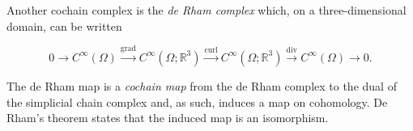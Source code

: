 \begin{tcolorbox}[enhanced,breakable,colback=KuangNei,frame hidden,boxrule=0pt,sharpish corners,before skip=10pt,after skip=10pt]
{Another cochain complex is the \emph{de Rham complex} which, on a three-dimensional domain, can be written}

\[
0\to C^\infty(\Omega)\xrightarrow{\operatorname{grad}}C^\infty(\Omega;\mathbb R^3)\xrightarrow{\operatorname{curl}}C^\infty(\Omega;\mathbb R^3)\xrightarrow{\operatorname{div}}C^\infty(\Omega)\to0.
\]

{The de Rham map is a \emph{cochain map} from the de Rham complex to the dual of the simplicial chain complex and, as such, induces a map on cohomology. De Rham's theorem states that the induced map is an isomorphism.}
\end{tcolorbox}
